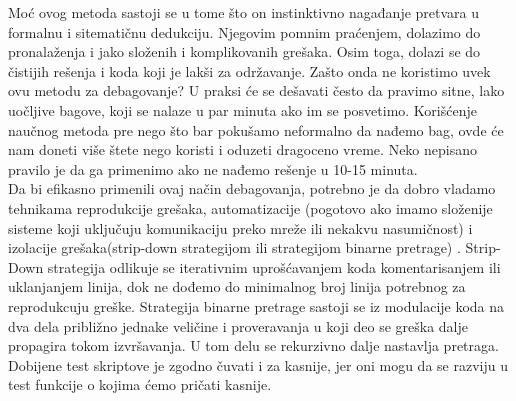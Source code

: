 \documentclass[a4paper]{article}
\begin{document}
	Moć ovog metoda sastoji se u tome što on instinktivno nagađanje pretvara u formalnu i sitematičnu dedukciju. Njegovim pomnim praćenjem, dolazimo do pronalaženja i jako složenih i komplikovanih grešaka. Osim toga, dolazi se do čistijih rešenja i koda koji je lakši za održavanje.
	Zašto onda ne koristimo uvek ovu metodu za debagovanje?  U praksi će se dešavati često da pravimo sitne, lako uočljive bagove, koji se nalaze u par minuta ako im se posvetimo. Korišćenje naučnog metoda pre nego što bar pokušamo neformalno da nađemo bag, ovde će nam doneti više štete nego koristi i oduzeti dragoceno vreme. Neko nepisano pravilo je da ga primenimo ako ne nađemo rešenje u 10-15 minuta. \\
	Da bi efikasno primenili ovaj način debagovanja, potrebno je da dobro vladamo tehnikama reprodukcije grešaka, automatizacije (pogotovo ako imamo složenije sisteme koji uključuju komunikaciju preko mreže ili nekakvu nasumičnost) i izolacije grešaka(strip-down strategijom ili strategijom binarne pretrage) \cite{proPyDeb}.
	Strip-Down strategija odlikuje se iterativnim uprošćavanjem koda komentarisanjem ili uklanjanjem linija, dok ne dođemo do minimalnog broj linija potrebnog za  reprodukcuju greške. Strategija binarne pretrage sastoji se iz modulacije koda na dva dela približno jednake veličine i proveravanja u koji deo se greška dalje propagira tokom izvršavanja. U tom delu se rekurzivno dalje nastavlja pretraga. Dobijene test skriptove je zgodno čuvati i za kasnije, jer oni mogu da se razviju u test funkcije o kojima ćemo pričati kasnije.
\end{document}
